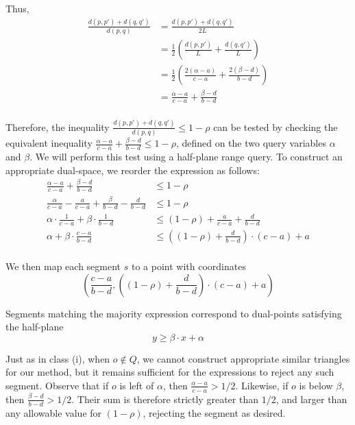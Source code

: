 \noindent Thus,
\[
\begin{split} 
\frac{d(p, p') + d(q, q')}{d(p, q)}
%
&= \frac{d(p, p') + d(q, q')}{2L} \\
%
&= \frac{1}{2} \left ( \frac{d(p, p')}{L} + \frac{d(q, q')}{L} \right ) \\
%
&= \frac{1}{2} \left ( \frac{2(\alpha - a)}{c - a} + \frac{2(\beta - d)}{b - d} \right ) \\
%
&= \frac{\alpha - a}{c - a} + \frac{\beta - d}{b - d} \\
%
\end{split}
\]

Therefore, the inequality $\frac{d(p, p') + d(q, q')}{d(p, q)} \leq 1 - \rho$ can be tested by checking the equivalent inequality $\frac{\alpha - a}{c - a} + \frac{\beta - d}{b - d} \leq 1 - \rho$, defined on the two query variables $\alpha$ and $\beta$. We will perform this test using a half-plane range query. To construct an appropriate dual-space, we reorder the expression as follows:
\[
\begin{split}
\frac{\alpha - a}{c - a} + \frac{\beta - d}{b - d} &\leq 1 - \rho \\
%
\frac{\alpha}{c-a} - \frac{a}{c-a} + \frac{\beta}{b-d} - \frac{d}{b-d} &\leq 1 - \rho \\
%
\alpha \cdot \frac{1}{c-a} + \beta \cdot \frac{1}{b-d} &\leq (1 - \rho) + \frac{a}{c-a} + \frac{d}{b-d} \\
%
\alpha + \beta \cdot \frac{c-a}{b-d} &\leq \left ( (1 - \rho) + \frac{d}{b-d} \right ) \cdot (c-a) + a \\
%
\end{split}
\]

We then map each segment $s$ to a point with coordinates
\[
\left (\frac{c-a}{b-d}, \left ( (1 - \rho) + \frac{d}{b-d} \right ) \cdot (c-a) + a \right )
\]

\noindent Segments matching the majority expression correspond to dual-points satisfying the half-plane 
\[
y \geq \beta \cdot x + \alpha
\]

Just as in class (i), when $o \not \in Q$, we cannot construct appropriate similar triangles for our method, but it remains sufficient for the expressions to reject any such segment. Observe that if $o$ is left of $\alpha$, then $\frac{\alpha - a}{c - a} > 1/2$. Likewise, if $o$ is below $\beta$, then $\frac{\beta - d}{b - d} > 1/2$. Their sum is therefore strictly greater than $1/2$, and larger than any allowable value for $(1 - \rho)$, rejecting the segment as desired.


